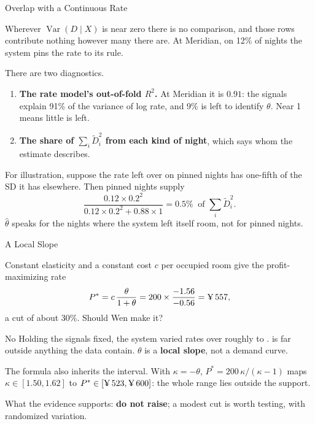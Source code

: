 \documentclass[aspectratio=169, 11pt, handout]{beamer}
\newcommand{\Var}{\operatorname{Var}}
\begin{document}
\begin{frame}{Overlap with a Continuous Rate}

Wherever $\Var(D \mid X)$ is near zero there is no comparison, and those rows contribute nothing however many there are. At Meridian, on 12\% of nights the system pins the rate to its rule.

\bigskip

There are two diagnostics.
\begin{enumerate}
  \item \textbf{The rate model's out-of-fold $R^2$.} At Meridian it is $0.91$: the signals explain 91\% of the variance of log rate, and 9\% is left to identify $\theta$. Near 1 means little is left.
  \item \textbf{The share of $\sum_i \tilde D_i^2$ from each kind of night}, which says whom the estimate describes.
\end{enumerate}

\bigskip

For illustration, suppose the rate left over on pinned nights has one-fifth of the SD it has elsewhere. Then pinned nights supply
\[
\frac{0.12 \times 0.2^2}{0.12 \times 0.2^2 + 0.88 \times 1} = 0.5\% \ \text{ of } \textstyle\sum_i \tilde D_i^2 .
\]
$\hat\theta$ speaks for the nights where the system left itself room, not for pinned nights.
\end{frame}

\begin{frame}{A Local Slope}

Constant elasticity and a constant cost $c$ per occupied room give the profit-maximizing rate
\[
P^{\ast} = c\,\frac{\theta}{1 + \theta} = 200 \times \frac{-1.56}{-0.56} = \text{\textyen}\,557,
\]
a cut of about 30\%. Should Wen make it?

\bigskip

\begin{alertblock}{No}
Holding the signals fixed, the system varied rates over roughly  to .  is far outside anything the data contain. $\theta$ is a \textbf{local slope}, not a demand curve.
\end{alertblock}

\bigskip

The formula also inherits the interval. With $\kappa = -\theta$, $P^{\ast} = 200\,\kappa/(\kappa - 1)$ maps $\kappa \in [1.50, 1.62]$ to $P^{\ast} \in [\text{\textyen}\,523, \text{\textyen}\,600]$: the whole range lies outside the support.

\bigskip

What the evidence supports: \textbf{do not raise}; a modest cut is worth testing, with randomized variation.
\end{frame}
\end{document}
